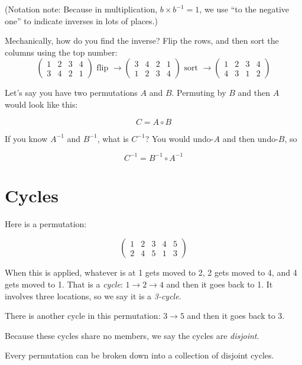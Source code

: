 (Notation note: Because in multiplication, $b \times b^{-1} = 1$, we
use ``to the negative one'' to indicate inverses in lots of places.)

Mechanically, how do you find the inverse? Flip the rows, and then sort the columns using the top number:
$$\begin{pmatrix}
  1 & 2 & 3 & 4 \\
  3 & 4 & 2 & 1
\end{pmatrix}
\text{ flip }\rightarrow
\begin{pmatrix}
  3 & 4 & 2 & 1 \\
  1 & 2 & 3 & 4
\end{pmatrix}
\text{ sort }\rightarrow
\begin{pmatrix}
  1 & 2 & 3 & 4 \\
  4 & 3 & 1 & 2
\end{pmatrix}
$$    

Let's say you have two permutations $A$ and $B$. Permuting by $B$ and then $A$ would look like this:

$$C = A \circ B$$

If you know $A^{-1}$ and $B^{-1}$, what is $C^{-1}$?  You would undo-$A$ and then undo-$B$, so

$$C^{-1} = B^{-1} \circ A^{-1}$$

\section{Cycles}

Here is a permutation:

$$\begin{pmatrix}
  1 & 2 & 3 & 4 & 5 \\
  2 & 4 & 5 & 1 & 3
\end{pmatrix}$$

When this is applied, whatever is at 1 gets moved to 2, 2 gets moved
to 4, and 4 gets moved to 1.  That is a \textit{cycle}: $1 \rightarrow
2 \rightarrow 4$ and then it goes back to 1. It involves three locations, so we say
it is a \textit{3-cycle}.

There is another cycle in this permutation: $3 \rightarrow 5$ and then it goes back to 3.

Because these cycles share no members, we say the cycles are \textit{disjoint}.

Every permutation can be broken down into a collection of disjoint cycles.


